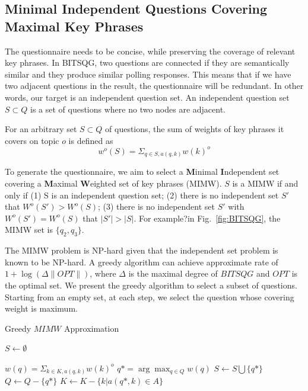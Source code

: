 \documentclass{llncs}
\begin{document}
\subsection{Minimal Independent Questions Covering Maximal Key Phrases}

The questionnaire needs to be concise, while preserving the coverage of relevant key phrases. In BITSQG, two questions are connected if they are semantically similar and they produce similar polling responses. This means that if we have two adjacent questions in the result, the questionnaire will be redundant.  In other words, our target is an independent question set. An independent question set $S\subset Q$ is a set of questions where no two nodes are adjacent.   


For an arbitrary set $S\subset Q$ of questions, the sum of weights of key phrases it covers on topic $o$ is  defined as 
\begin{equation}
w^o(S)=\Sigma_{q\in S, a(q,k)} w(k)^o 
\end{equation}

To generate the questionnaire, we aim to select a \textbf{M}inimal \textbf{I}ndependent set covering a \textbf{M}aximal \textbf{W}eighted set of key phrases (MIMW).  $S$ is a MIMW if and only if (1) S is an independent question set; (2) there is no independent set $S'$ that  $W^o(S')>W^o(S)$; (3) there is no independent set $S'$ with $W^o(S')=W^o(S)$ that $|S'|>|S|$.  For example?in Fig.~\ref{fig:BITSQG}, the MIMW set is $\{q_2,q_3\}$. 

The MIMW problem is NP-hard given that the independent set problem is known to be NP-hard. A greedy algorithm can achieve approximate rate of $1 + \log(\Delta\|OPT\|)$, where $\Delta$ is the maximal degree of $BITSQG$ and $OPT$ is the optimal set. We present the greedy algorithm to select a subset of questions. Starting from an empty set, at each step, we select the question whose covering weight is maximum. 

 \begin{algorithm}[htbp]\label{alg:MIMW}
\caption{Greedy $MIMW$ Approximation}
$S\leftarrow\emptyset$\;
{

{
$w(q)=\Sigma_{k\in K, a(q,k)} w(k)^o$\;
}
$q\ast=\arg\max_{q \in Q} w(q)$\;
$S \leftarrow S \bigcup \{q\ast\}$\;
$Q \leftarrow Q-\{q\ast\}$\;
$K \leftarrow K -\{k|a(q\ast,k) \in A\}$\;
}
\end{algorithm}
\end{document}
